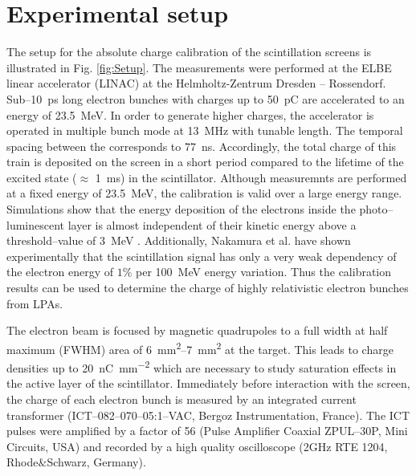 \documentclass[%
preprint,
amsmath,
amssymb,
aip,
rsi, 
numerical,
floatfix,
]{revtex4-1}
\newcommand{\myCite}[1]{\textcolor{blue}{\cite{#1}}}
\begin{document}
\section{\label{Set} Experimental setup}

The setup for the absolute charge calibration of the scintillation screens is illustrated in Fig. \ref{fig:Setup}.
The measurements were performed at the ELBE linear accelerator (LINAC) at the Helmholtz-Zentrum Dresden -- Rossendorf. 
Sub--\SI{10}{\pico\second} long electron bunches with charges up to \SI{50}{\pico\coulomb} are accelerated to an energy of \SI{23.5}{\mega\electronvolt}. 
In order to generate higher charges, the accelerator is operated in multiple bunch mode at \SI{13}{\mega\hertz} with tunable length. 
The temporal spacing between the corresponds to \SI{77}{\nano\second}. 
Accordingly, the total charge of this train is deposited on the screen in a short period compared to the lifetime of the excited state ($\approx$ \SI{1}{\milli\second}) in the scintillator\myCite{Morlotti1997}.
Although measuremnts are performed at a fixed energy of \SI{23.5}{\mega\electronvolt}, the calibration is valid over a large energy range.
Simulations show that the energy deposition of the electrons inside the photo--luminescent layer is almost independent of their kinetic energy above a threshold--value of \SI{3}{\mega\electronvolt} \myCite{Hidding2007,Glinec2006,Masuda2008}.
Additionally, Nakamura et al.\myCite{Nakamura2011} have shown experimentally that the scintillation signal has only a very weak dependency of the electron energy of $1\%$ per \SI{100}{\mega \electronvolt} energy variation.
Thus the calibration results can be used to determine the charge of highly relativistic electron bunches from LPAs.

The electron beam is focused by magnetic quadrupoles to a full width at half maximum (FWHM) area of \SIrange{6}{7}{\milli\metre^2} at the target.
This leads to charge densities up to \SI[per-mode=symbol]{20}{\nano\coulomb \per \square\milli\meter} which are necessary to study saturation effects in the active layer of the scintillator.
Immediately before interaction with the screen, the charge of each electron bunch is measured by an integrated current transformer (ICT--082--070--05:1--VAC, Bergoz Instrumentation, France). 
The ICT pulses were amplified by a factor of 56 (Pulse Amplifier Coaxial ZPUL--30P, Mini Circuits, USA) and recorded by a high quality oscilloscope (2GHz RTE 1204, Rhode$\&$Schwarz, Germany).
\end{document}
